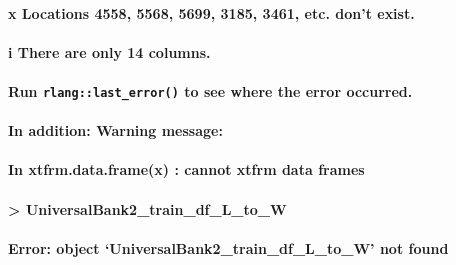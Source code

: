 \documentclass[
]{article}
\begin{document}
\hypertarget{x-locations-4558-5568-5699-3185-3461-etc.-dont-exist.}{%
\paragraph{x Locations 4558, 5568, 5699, 3185, 3461, etc. don't
exist.}\label{x-locations-4558-5568-5699-3185-3461-etc.-dont-exist.}}

\hypertarget{i-there-are-only-14-columns.}{%
\paragraph{i There are only 14
columns.}\label{i-there-are-only-14-columns.}}

\hypertarget{run-rlanglast_error-to-see-where-the-error-occurred.}{%
\paragraph{\texorpdfstring{Run \texttt{rlang::last\_error()} to see
where the error
occurred.}{Run rlang::last\_error() to see where the error occurred.}}\label{run-rlanglast_error-to-see-where-the-error-occurred.}}

\hypertarget{in-addition-warning-message}{%
\paragraph{In addition: Warning
message:}\label{in-addition-warning-message}}

\hypertarget{in-xtfrm.data.framex-cannot-xtfrm-data-frames}{%
\paragraph{In xtfrm.data.frame(x) : cannot xtfrm data
frames}\label{in-xtfrm.data.framex-cannot-xtfrm-data-frames}}

\hypertarget{universalbank2_train_df_l_to_w}{%
\paragraph{\textgreater{}
UniversalBank2\_train\_df\_L\_to\_W}\label{universalbank2_train_df_l_to_w}}

\hypertarget{error-object-universalbank2_train_df_l_to_w-not-found}{%
\paragraph{Error: object `UniversalBank2\_train\_df\_L\_to\_W' not
found}\label{error-object-universalbank2_train_df_l_to_w-not-found}}
\end{document}
